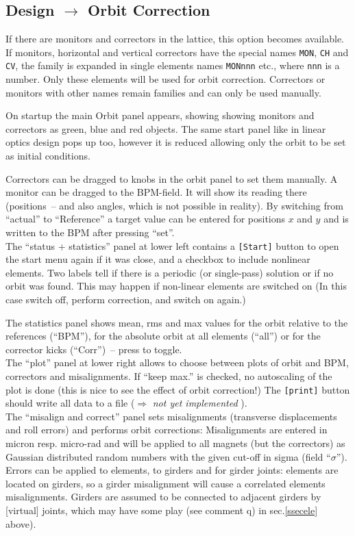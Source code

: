 \documentclass[12pt]{article}
\newcommand\todo[1]{$\Longrightarrow$ {\em #1} }
\begin{document}
\subsection{Design $\longrightarrow$ Orbit Correction}

If there are monitors and correctors in the lattice, this option becomes available.
If monitors, horizontal and vertical correctors have the special names
{\tt MON}, {\tt CH} and {\tt CV}, the family is expanded in single
elements names {\tt MONnnn} etc., where {\tt nnn} is a number. Only
these elements will be used for orbit correction.
Correctors or monitors with other names remain families and can only be used manually.

On startup the main Orbit panel appears, showing showing monitors and correctors as green, blue and red objects. The same start panel like in linear optics design pops up too, however it is reduced allowing only the orbit to be set as initial conditions. 

Correctors can be dragged to knobs in the orbit panel to set them manually. 
A monitor can be dragged to the BPM-field. It will show its reading there (positions~-- and also angles, which is not possible in reality). 
By switching from ``actual'' to ``Reference'' a target value can be entered for positions $x$ and $y$ and is written to the BPM after pressing ``set''.\\

The ``status + statistics'' panel at lower left contains a {\tt [Start]} button to open the start menu again if it was close, and a checkbox to include nonlinear elements. 
Two labels tell if there is a periodic (or single-pass) solution or if no orbit was found. This may happen if non-linear elements are switched on (In this case switch off, perform correction, and switch on again.)

The statistics panel shows mean, rms and max values for
the orbit relative to the references (``BPM''), for the absolute orbit at all elements (``all'') or for the corrector kicks (``Corr'')~-- press to toggle.\\

The ``plot'' panel at lower right allows to choose between plots of orbit and BPM, correctors and misalignments.
If ``keep max.'' is checked, no autoscaling of the plot is done (this is nice to see the effect of orbit correction!)
The {\tt [print]} button should write all data to a file (\todo{not yet implemented}).\\

The ``misalign and correct'' panel sets misalignments (transverse displacements and roll errors) and performs orbit corrections:
Misalignments are entered in micron resp. micro-rad and will be applied to all magnets (but the correctors) as Gaussian distributed random numbers with the given cut-off in sigma (field ``$\sigma$'').
Errors can be applied to elements, to girders and for girder joints: 
elements are located on girders, so a girder misalignment will cause a correlated elements misalignments. Girders are assumed to be connected to adjacent girders  by [virtual] joints, which may have some play (see comment q) in sec.\ref{ssecele} above).
\end{document}
